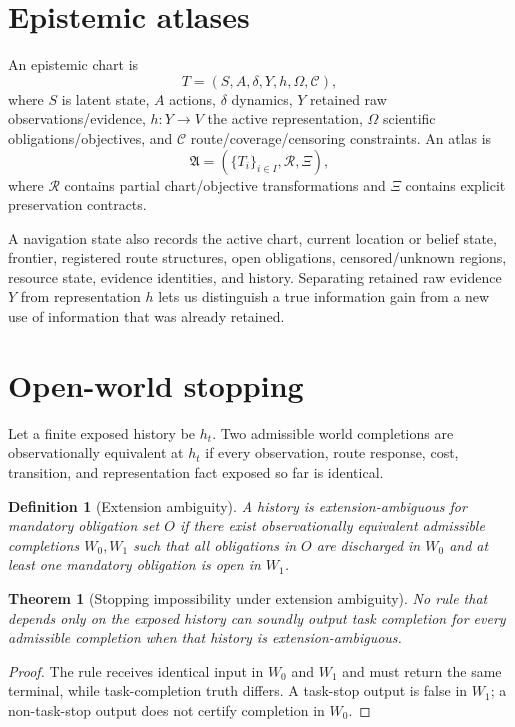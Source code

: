 \documentclass[11pt]{article}
\newtheorem{theorem}{Theorem}
\newtheorem{definition}{Definition}
\begin{document}
\section{Epistemic atlases}
An epistemic chart is
\[
T=(S,A,\delta,Y,h,\Omega,\mathcal C),
\]
where $S$ is latent state, $A$ actions, $\delta$ dynamics, $Y$ retained raw observations/evidence, $h:Y\rightarrow V$ the active representation, $\Omega$ scientific obligations/objectives, and $\mathcal C$ route/coverage/censoring constraints. An atlas is
\[
\mathfrak A=(\{T_i\}_{i\in I},\mathcal R,\Xi),
\]
where $\mathcal R$ contains partial chart/objective transformations and $\Xi$ contains explicit preservation contracts.

A navigation state also records the active chart, current location or belief state, frontier, registered route structures, open obligations, censored/unknown regions, resource state, evidence identities, and history. Separating retained raw evidence $Y$ from representation $h$ lets us distinguish a true information gain from a new use of information that was already retained.

\section{Open-world stopping}
Let a finite exposed history be $h_t$. Two admissible world completions are observationally equivalent at $h_t$ if every observation, route response, cost, transition, and representation fact exposed so far is identical.

\begin{definition}[Extension ambiguity]
A history is extension-ambiguous for mandatory obligation set $O$ if there exist observationally equivalent admissible completions $W_0,W_1$ such that all obligations in $O$ are discharged in $W_0$ and at least one mandatory obligation is open in $W_1$.
\end{definition}

\begin{theorem}[Stopping impossibility under extension ambiguity]
No rule that depends only on the exposed history can soundly output task completion for every admissible completion when that history is extension-ambiguous.
\end{theorem}
\begin{proof}
The rule receives identical input in $W_0$ and $W_1$ and must return the same terminal, while task-completion truth differs. A task-stop output is false in $W_1$; a non-task-stop output does not certify completion in $W_0$.
\end{proof}
\end{document}
